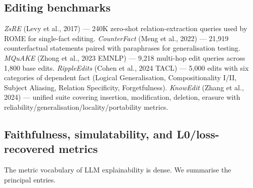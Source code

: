 \subsection{Editing benchmarks}\label{editing-benchmarks}

\emph{ZsRE} (Levy et al., 2017) --- 240K zero-shot relation-extraction queries used by ROME for single-fact editing. \emph{CounterFact} (Meng et al., 2022) --- 21,919 counterfactual statements paired with paraphrases for generalisation testing. \emph{MQuAKE} (Zhong et al., 2023 EMNLP) --- 9,218 multi-hop edit queries across 1,800 base edits. \emph{RippleEdits} (Cohen et al., 2024 TACL) --- 5,000 edits with six categories of dependent fact (Logical Generalisation, Compositionality I/II, Subject Aliasing, Relation Specificity, Forgetfulness). \emph{KnowEdit} (Zhang et al., 2024) --- unified suite covering insertion, modification, deletion, erasure with reliability/generalisation/locality/portability metrics.

\subsection{Faithfulness, simulatability, and L0/loss-recovered metrics}\label{faithfulness-simulatability-and-l0loss-recovered-metrics}

The metric vocabulary of LLM explainability is dense. We summarise the principal entries.

